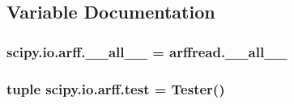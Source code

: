 \subsection{Variable Documentation}
\hypertarget{namespacescipy_1_1io_1_1arff_a12e41f7d3b05e6f24ed3ea53adef2af7}{}
\subsubsection[{\+\_\+\+\_\+all\+\_\+\+\_\+}]{\setlength{\rightskip}{0pt plus 5cm}scipy.\+io.\+arff.\+\_\+\+\_\+all\+\_\+\+\_\+ = arffread.\+\_\+\+\_\+all\+\_\+\+\_\+}\label{namespacescipy_1_1io_1_1arff_a12e41f7d3b05e6f24ed3ea53adef2af7}
\hypertarget{namespacescipy_1_1io_1_1arff_ac902c6dc61d43824db7dda4e6a6305ee}{}
\subsubsection[{test}]{\setlength{\rightskip}{0pt plus 5cm}tuple scipy.\+io.\+arff.\+test = Tester()}\label{namespacescipy_1_1io_1_1arff_ac902c6dc61d43824db7dda4e6a6305ee}
